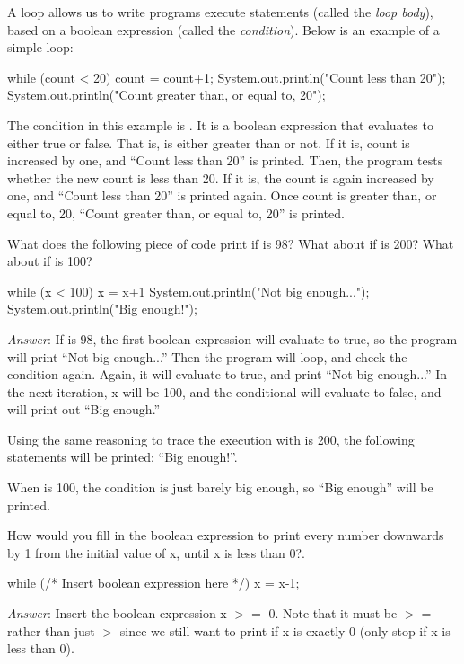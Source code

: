 A  loop allows us to write programs execute statements (called the \emph{loop body}), based on a boolean expression (called the \emph{condition}). Below is an example of a simple  loop:

\begin{code}
while (count < 20) {
  count = count+1;
  System.out.println("Count less than 20");
}
System.out.println("Count greater than, or equal to, 20");
\end{code}

\noindent The condition in this example is . It is a boolean expression that evaluates to either true or false. That is,  is either greater than  or not. If it is, count is increased by one, and ``Count less than 20'' is printed. Then, the program tests whether the new count is less than 20. If it is, the count is again increased by one, and ``Count less than
20'' is printed again. Once count is greater than, or equal to, 20, ``Count greater than, or equal to, 20'' is printed.

\begin{example}
What does the following piece of code print if  is 98? What about if  is 200? What about if  is 100?

\begin{code}
while (x < 100) {
    x = x+1
    System.out.println("Not big enough...");
} 
System.out.println("Big enough!");
\end{code}

\emph{Answer}: If  is 98, the first boolean expression will evaluate to true, so the program will print ``Not big enough...'' Then the program will loop, and check the condition again.  Again, it will evaluate to true, and print
``Not big enough...'' In the next iteration, x will be 100, and the conditional will evaluate to false, and will print out ``Big enough.''

Using the same reasoning to trace the execution with  is 200, the following statements will be printed: ``Big enough!''.

When  is 100, the condition is just barely big enough, so ``Big enough''
will be printed.
\end{example}

\begin{example}
How would you fill in the boolean expression to print every number downwards by 1 from the initial value of x, until x is less than 0?.

\begin{code}
while (/* Insert boolean expression here */) {
    x = x-1;
} 
\end{code}

\emph{Answer}: Insert the boolean expression x $>=$ 0. Note that it must be $>=$ rather than just $>$ since we still want to print if x is exactly 0 (only stop if x is less than 0). 
\end{example}

